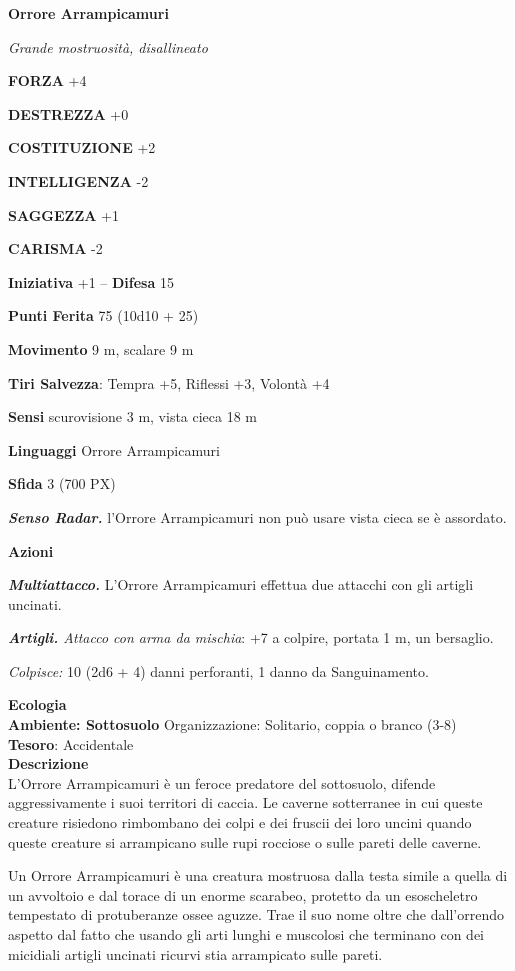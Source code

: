 \begin{multicols}{2}
\medskip{}\textbf{Orrore Arrampicamuri}

\textit{Grande mostruosità, disallineato}

\textbf{FORZA} +4

\textbf{DESTREZZA} +0

\textbf{COSTITUZIONE} +2

\textbf{INTELLIGENZA} -2

\textbf{SAGGEZZA} +1

\textbf{CARISMA} -2

\textbf{Iniziativa} +1 -- \textbf{Difesa} 15

\textbf{Punti Ferita} 75 (10d10 + 25)

\textbf{Movimento} 9 m, scalare 9 m

\textbf{Tiri Salvezza}: Tempra +5, Riflessi +3, Volontà +4

\textbf{Sensi} scurovisione 3 m, vista cieca 18 m

\textbf{Linguaggi} Orrore Arrampicamuri

\textbf{Sfida} 3 (700 PX)

\textit{\textbf{Senso Radar.}} l'Orrore Arrampicamuri non può usare vista cieca se è assordato.

\textbf{Azioni}

\textit{\textbf{Multiattacco.}} L'Orrore Arrampicamuri effettua due attacchi con gli artigli uncinati.

\textit{\textbf{Artigli.} Attacco con arma da mischia}: +7 a colpire, portata 1 m, un bersaglio.

\textit{Colpisce:} 10 (2d6 + 4) danni perforanti, 1 danno da Sanguinamento.

\textbf{Ecologia}\\
\textbf{Ambiente: Sottosuolo}
Organizzazione: Solitario, coppia o branco (3-8)\\
\textbf{Tesoro}: Accidentale\\
\textbf{Descrizione}\\
L'Orrore Arrampicamuri è un feroce predatore del sottosuolo, difende aggressivamente i suoi territori di caccia. Le caverne sotterranee in cui queste creature risiedono rimbombano dei colpi e dei fruscii dei loro uncini quando queste creature si arrampicano sulle rupi rocciose o sulle pareti delle caverne.

Un Orrore Arrampicamuri è una creatura mostruosa dalla testa simile a quella di un avvoltoio e dal torace di un enorme scarabeo, protetto da un esoscheletro tempestato di protuberanze ossee aguzze. Trae il suo nome oltre che dall'orrendo aspetto dal fatto che usando gli arti lunghi e muscolosi che terminano con dei micidiali artigli uncinati ricurvi stia arrampicato sulle pareti.


\end{multicols}

